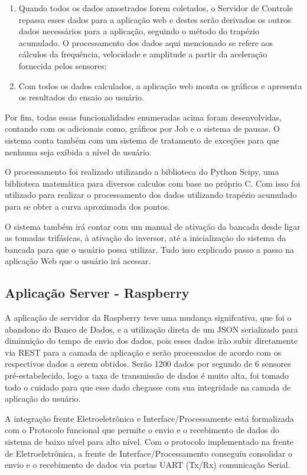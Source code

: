 \begin{enumerate}
 \item Quando todos os dados amostrados forem coletados, o Servidor de Controle repassa esses dados para a aplicação web e destes serão derivados os outros dados necessários para a aplicação, seguindo o método do trapézio acumulado. O processamento dos dados aqui mencionado se refere aos cálculos da frequência, velocidade e amplitude a partir da aceleração fornecida pelos sensores;
 \item Com todos os dados calculados, a aplicação web monta os gráficos e apresenta os resultados do ensaio ao usuário.
\end{enumerate}

Por fim, todas essas funcionalidades enumeradas acima foram desenvolvidas, contando com os adicionais como, gráficos por Job e o sistema de pausas. O sistema conta também com um sistema de tratamento de exceções para que nenhuma seja exibida a nível de usuário.

O processamento foi realizado utilizando a biblioteca do Python Scipy, uma biblioteca matemática para diversos calculos com base no próprio C. Com isso foi utilizado para realizar o processamento dos dados utilizando trapézio acumulado para se obter a curva aproximada dos pontos.

O sistema também irá contar com um manual de ativação da bancada desde ligar as tomadas trifásicas, à ativação do inversor, até a inicialização do sistema da bancada para que o usuário possa utilizar. Tudo isso explicado passo a passo na aplicação Web que o usuário irá acessar.

\subsection{Aplicação Server - Raspberry}

A aplicação de servidor da Raspberry teve uma mudança signifcativa, que foi o abandono do Banco de Dados, e a utilização direta de um JSON serializado para diminuição do tempo de envio dos dados, pois esses dados irão subir diretamente via REST para a camada de aplicação e serão processados de acordo com os respectivos dados a serem obtidos. Serão 1200 dados por segundo de 6 sensores pré-estabelecido, logo a taxa de transmissão de dados é muito alta, foi tomado todo o cuidado para que esse dado chegasse com sua integridade na camada de aplicação do usuário.

A integração frente Eletroeletrônica e Interface/Processamente está formalizada com o Protocolo funcional que permite o envio e o recebimento de dados do sistema de baixo nível para alto nível. Com o protocolo implementado na frente de Eletroeletrônica, a frente de Interface/Processamento conseguiu consolidar o envio e o recebimento de dados via portas UART (Tx/Rx) comunicação Serial.

